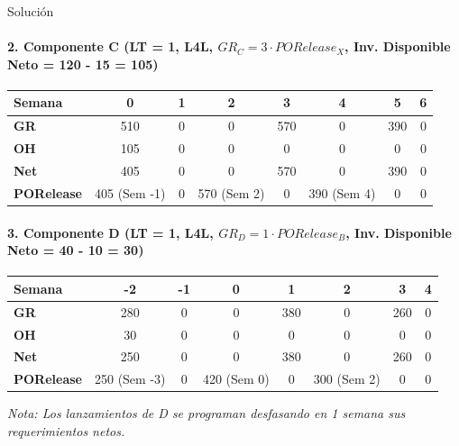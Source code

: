 \documentclass[11pt, a4paper]{article}
\begin{document}
\begin{ejercicio}{Solución}
  \paragraph{2. Componente C (LT = 1, L4L, $GR_C = 3 \cdot PORelease_X$, Inv. Disponible Neto = 120 - 15 = 105)}
  \begin{center}
  \small
  \begin{tabular}{lccccccc}
    \toprule
    \textbf{Semana} & \textbf{0} & \textbf{1} & \textbf{2} & \textbf{3} & \textbf{4} & \textbf{5} & \textbf{6} \\
    \midrule
    \textbf{GR} & 510 & 0 & 0 & 570 & 0 & 390 & 0 \\
    \textbf{OH} & 105 & 0 & 0 & 0 & 0 & 0 & 0 \\
    \textbf{Net} & 405 & 0 & 0 & 570 & 0 & 390 & 0 \\
    \textbf{PORelease} & 405 (Sem -1) & 0 & 570 (Sem 2) & 0 & 390 (Sem 4) & 0 & 0 \\
    \bottomrule
  \end{tabular}
  \end{center}

  \paragraph{3. Componente D (LT = 1, L4L, $GR_D = 1 \cdot PORelease_B$, Inv. Disponible Neto = 40 - 10 = 30)}
  \begin{center}
  \small
  \begin{tabular}{lccccccc}
    \toprule
    \textbf{Semana} & \textbf{-2} & \textbf{-1} & \textbf{0} & \textbf{1} & \textbf{2} & \textbf{3} & \textbf{4} \\
    \midrule
    \textbf{GR} & 280 & 0 & 0 & 380 & 0 & 260 & 0 \\
    \textbf{OH} & 30 & 0 & 0 & 0 & 0 & 0 & 0 \\
    \textbf{Net} & 250 & 0 & 0 & 380 & 0 & 260 & 0 \\
    \textbf{PORelease} & 250 (Sem -3) & 0 & 420 (Sem 0) & 0 & 300 (Sem 2) & 0 & 0 \\
    \bottomrule
  \end{tabular}
  \end{center}
  \textit{Nota: Los lanzamientos de D se programan desfasando en 1 semana sus requerimientos netos.}

\end{ejercicio}

\newpage
\end{document}
